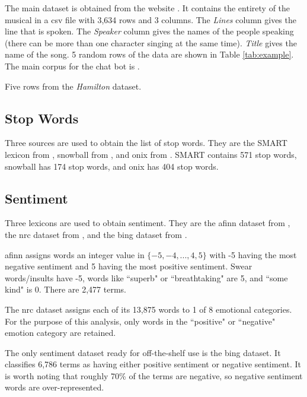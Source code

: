 \documentclass{article}
\begin{document}
The main dataset is obtained from the website \cite{Kaggle2019}. It contains the entirety of the musical in a csv file with 3,634 rows and 3 columns. The \emph{Lines} column gives the line that is spoken. The \emph{Speaker} column gives the names of the people speaking (there can be more than one character singing at the same time). \emph{Title} gives the name of the song. 5 random rows of the data are shown in Table \ref{tab:example}. The main corpus for the chat bot is \cite{Wiki}.

\begin{table}
\caption{Five rows from the \emph{Hamilton} dataset.}
\label{tab:example}

\end{table}

\subsection{Stop Words}

Three sources are used to obtain the list of stop words. They are the SMART lexicon from \cite{Lewis2004}, snowball from \cite{snowball}, and onix from \cite{onix}. SMART contains 571 stop words, snowball has 174 stop words, and onix has 404 stop words.

\subsection{Sentiment}

Three lexicons are used to obtain sentiment. They are the afinn dataset from \cite{nielsen11}, the nrc dataset from \cite{mohammad2013}, and the bing dataset from \cite{Hu2004}.

afinn assigns words an integer value in $\{-5, -4, ..., 4, 5\}$ with -5 having the most negative sentiment and 5 having the most positive sentiment. Swear words/insults have -5, words like ``superb" or ``breathtaking" are 5, and ``some kind" is 0. There are 2,477 terms. 

The nrc dataset assigns each of its 13,875 words to 1 of 8 emotional categories. For the purpose of this analysis, only words in the ``positive" or ``negative" emotion category are retained. 

The only sentiment dataset ready for off-the-shelf use is the bing dataset. It classifies 6,786 terms as having either positive sentiment or negative sentiment. It is worth noting that roughly 70\% of the terms are negative, so negative sentiment words are over-represented. 
\end{document}
